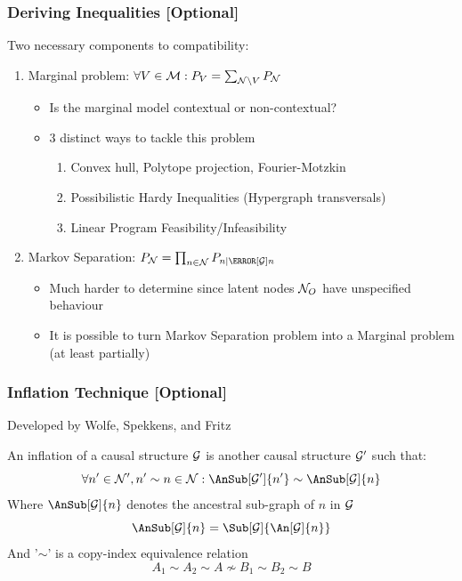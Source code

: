 \documentclass[
    hyperref={bookmarks=false},%
    xcolor={dvipsnames},
]{beamer}
\renewcommand{\term}[1]{\textcolor{Mahogany}{#1}}
\begin{document}
\begin{frame}
    \frametitle{Deriving Inequalities [Optional]}
    Two necessary components to compatibility:
    \begin{enumerate}
        \item \term{Marginal problem}: $\forall V \in \mscenario : \prob[V] = \sum_{\nodes \setminus V} \prob[\nodes]$
        \begin{itemize}
            \item Is the marginal model contextual or non-contextual?
            \item 3 distinct ways to tackle this problem
            \begin{enumerate}
                \item Convex hull, Polytope projection, Fourier-Motzkin
                \item Possibilistic Hardy Inequalities (Hypergraph transversals)
                \item Linear Program Feasibility/Infeasibility
            \end{enumerate}
        \end{itemize}
        \item \term{Markov Separation}: $\prob[\nodes] = \prod_{n\in\nodes}\prob[n \mid \Pa[\graph]{n}]$
        \begin{itemize}
            \item Much harder to determine since latent nodes $\mathcal{N}_O$ have unspecified behaviour
            \item It is possible to turn Markov Separation problem into a Marginal problem (at least partially)
        \end{itemize}
    \end{enumerate}
\end{frame}

\begin{frame}
    \frametitle{Inflation Technique [Optional]}
    Developed by Wolfe, Spekkens, and Fritz \cite{Inflation}
    \begin{definition}
        An \term{inflation} of a causal structure $\mathcal{G}$ is another causal structure $\mathcal{G}'$ such that:
        \[ \forall n' \in \nodes', n' \sim n \in \nodes: \AnSub[\graph']{n'} \sim \AnSub[\graph]{n} \]
        Where $\AnSub[\graph]{n}$ denotes the ancestral sub-graph of $n$ in $\mathcal{G}$
        \[ \AnSub[\graph]{n} = \Sub[\graph]{\An[\graph]{n}} \]
        And '$\sim$' is a \term{copy-index} equivalence relation
        \[ A_1 \sim A_2 \sim A \not \sim B_1 \sim B_2 \sim B \]
    \end{definition}
\end{frame}
\end{document}
